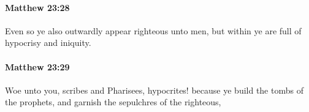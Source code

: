 		\paragraph{Matthew 23:28} %
			\label{MATTHEW-23-28}

			Even so ye also outwardly appear righteous unto men, but within ye are full of hypocrisy and iniquity.

			\begin{framed}
			\scriptsize
				\begin{compactdesc}
					\item[SBLG]  \hyperref[ANOMIA]{}
				\end{compactdesc}
			\end{framed}

		\paragraph{Matthew 23:29} %
			\label{MATTHEW-23-29}

			Woe unto you, scribes and Pharisees, hypocrites! because ye build the tombs of the prophets, and garnish the sepulchres of the righteous,


